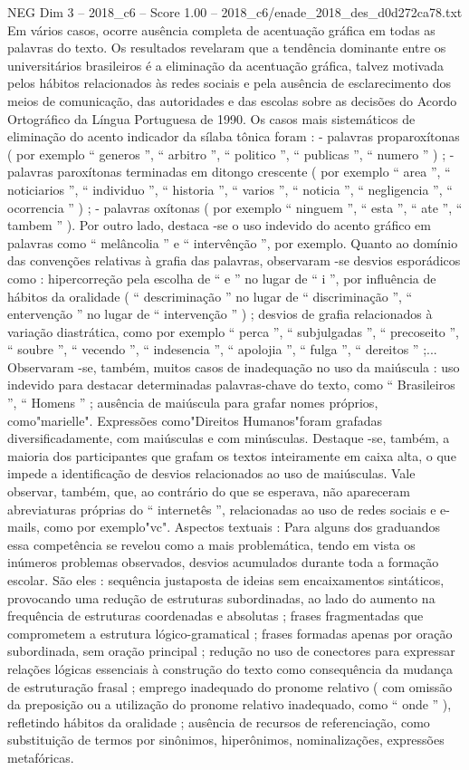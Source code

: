 \begin{textsample}{NEG Dim 3 – 2018\_c6 – Score 1.00 – 2018\_c6/enade\_2018\_des\_d0d272ca78.txt}
Em vários casos, ocorre ausência completa de acentuação gráfica em todas as palavras do texto.
Os resultados revelaram que a tendência dominante entre os universitários brasileiros é a eliminação da acentuação gráfica, talvez motivada pelos hábitos relacionados às redes sociais e pela ausência de esclarecimento dos meios de comunicação, das autoridades e das escolas sobre as decisões do Acordo Ortográfico da Língua Portuguesa de 1990.
Os casos mais sistemáticos de eliminação do acento indicador da sílaba tônica foram : - palavras proparoxítonas ( por exemplo “ generos ”, “ arbitro ”, “ politico ”, “ publicas ”, “ numero ” ) ; - palavras paroxítonas terminadas em ditongo crescente ( por exemplo “ area ”, “ noticiarios ”, “ individuo ”, “ historia ”, “ varios ”, “ noticia ”, “ negligencia ”, “ ocorrencia ” ) ; - palavras oxítonas ( por exemplo “ ninguem ”, “ esta ”, “ ate ”, “ tambem ” ).
Por outro lado, destaca -se o uso indevido do acento gráfico em palavras como “ melâncolia ” e “ intervênção ”, por exemplo.
Quanto ao domínio das convenções relativas à grafia das palavras, observaram -se desvios esporádicos como : hipercorreção pela escolha de “ e ” no lugar de “ i ”, por influência de hábitos da oralidade ( “ descriminação ” no lugar de “ discriminação ”, “ entervenção ” no lugar de “ intervenção ” ) ; desvios de grafia relacionados à variação diastrática, como por exemplo “ perca ”, “ subjulgadas ”, “ precoseito ”, “ soubre ”, “ vecendo ”, “ indesencia ”, “ apolojia ”, “ fulga ”, “ dereitos ” ;...
Observaram -se, também, muitos casos de inadequação no uso da maiúscula : uso indevido para destacar determinadas palavras-chave do texto, como “ Brasileiros ”, “ Homens ” ; ausência de maiúscula para grafar nomes próprios, como"marielle".
Expressões como"Direitos Humanos"foram grafadas diversificadamente, com maiúsculas e com minúsculas.
Destaque -se, também, a maioria dos participantes que grafam os textos inteiramente em caixa alta, o que impede a identificação de desvios relacionados ao uso de maiúsculas.
Vale observar, também, que, ao contrário do que se esperava, não apareceram abreviaturas próprias do “ internetês ”, relacionadas ao uso de redes sociais e e-mails, como por exemplo"vc".
Aspectos textuais : Para alguns dos graduandos essa competência se revelou como a mais problemática, tendo em vista os inúmeros problemas observados, desvios acumulados durante toda a formação escolar.
São eles : sequência justaposta de ideias sem encaixamentos sintáticos, provocando uma redução de estruturas subordinadas, ao lado do aumento na frequência de estruturas coordenadas e absolutas ; frases fragmentadas que comprometem a estrutura lógico-gramatical ; frases formadas apenas por oração subordinada, sem oração principal ; redução no uso de conectores para expressar relações lógicas essenciais à construção do texto como consequência da mudança de estruturação frasal ; emprego inadequado do pronome relativo ( com omissão da preposição ou a utilização do pronome relativo inadequado, como “ onde ” ), refletindo hábitos da oralidade ; ausência de recursos de referenciação, como substituição de termos por sinônimos, hiperônimos, nominalizações, expressões metafóricas.

\end{textsample}
